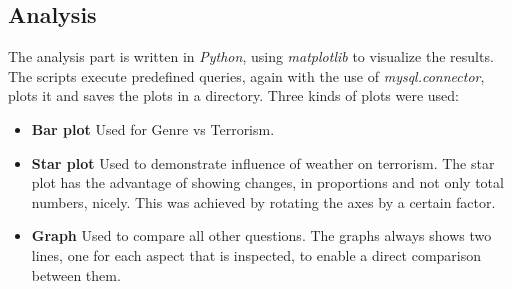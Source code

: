 \subsection{Analysis}
The analysis part is written in \emph{Python}, using \emph{matplotlib} to visualize the results. The scripts execute predefined queries, again with the use of \emph{mysql.connector}, plots it and saves the plots in a directory. Three kinds of plots were used:
\begin{itemize}
	\item \textbf{Bar plot} Used for Genre vs Terrorism.
	\item \textbf{Star plot} Used to demonstrate influence of weather on terrorism. The star plot has the advantage of showing changes, in proportions and not only total numbers, nicely. This was achieved by rotating the axes by a certain factor.
	\item \textbf{Graph} Used to compare all other questions. The graphs always shows two lines, one for each aspect that is inspected, to enable a direct comparison between them.
\end{itemize}

